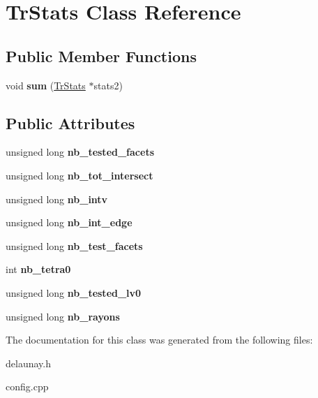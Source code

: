 \hypertarget{class_tr_stats}{
\section{TrStats Class Reference}
\label{class_tr_stats}
}
\subsection*{Public Member Functions}
\begin{DoxyCompactItemize}
\item 
\hypertarget{class_tr_stats_adc078942b91e4940d7cd479ad141c7b5}{
void {\bfseries sum} (\hyperlink{class_tr_stats}{TrStats} $\ast$stats2)}
\label{class_tr_stats_adc078942b91e4940d7cd479ad141c7b5}

\end{DoxyCompactItemize}
\subsection*{Public Attributes}
\begin{DoxyCompactItemize}
\item 
\hypertarget{class_tr_stats_a87a12908493a4065111d0c77ff009678}{
unsigned long {\bfseries nb\_\-tested\_\-facets}}
\label{class_tr_stats_a87a12908493a4065111d0c77ff009678}

\item 
\hypertarget{class_tr_stats_a3d4033d7f4886cfb82d941e21897acce}{
unsigned long {\bfseries nb\_\-tot\_\-intersect}}
\label{class_tr_stats_a3d4033d7f4886cfb82d941e21897acce}

\item 
\hypertarget{class_tr_stats_aa4d9812c2ef74f9d86b4b5cc50b9766d}{
unsigned long {\bfseries nb\_\-intv}}
\label{class_tr_stats_aa4d9812c2ef74f9d86b4b5cc50b9766d}

\item 
\hypertarget{class_tr_stats_a95aed605db899b514028a615f6ed444f}{
unsigned long {\bfseries nb\_\-int\_\-edge}}
\label{class_tr_stats_a95aed605db899b514028a615f6ed444f}

\item 
\hypertarget{class_tr_stats_aa6d678657deb3ddb2723ef804ca3c7c6}{
unsigned long {\bfseries nb\_\-test\_\-facets}}
\label{class_tr_stats_aa6d678657deb3ddb2723ef804ca3c7c6}

\item 
\hypertarget{class_tr_stats_a50445249236e80915c7d3cc9556c53b5}{
int {\bfseries nb\_\-tetra0}}
\label{class_tr_stats_a50445249236e80915c7d3cc9556c53b5}

\item 
\hypertarget{class_tr_stats_a0f7b2ad9c9363b68608cbcec16c82af3}{
unsigned long {\bfseries nb\_\-tested\_\-lv0}}
\label{class_tr_stats_a0f7b2ad9c9363b68608cbcec16c82af3}

\item 
\hypertarget{class_tr_stats_a8bdc211d4e6e25d9f1c0c00a7d35faf9}{
unsigned long {\bfseries nb\_\-rayons}}
\label{class_tr_stats_a8bdc211d4e6e25d9f1c0c00a7d35faf9}

\end{DoxyCompactItemize}


The documentation for this class was generated from the following files:\begin{DoxyCompactItemize}
\item 
delaunay.h\item 
config.cpp\end{DoxyCompactItemize}
